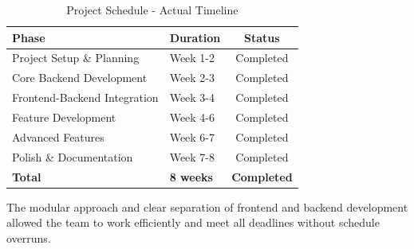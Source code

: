             \begin{table}[h]
            \centering
            \begin{tabular}{|l|l|c|}
            \hline
            \textbf{Phase} & \textbf{Duration} & \textbf{Status} \\
            \hline
            Project Setup \& Planning & Week 1-2 & Completed \\
            Core Backend Development & Week 2-3 & Completed \\
            Frontend-Backend Integration & Week 3-4 & Completed \\
            Feature Development & Week 4-6 & Completed \\
            Advanced Features & Week 6-7 & Completed \\
            Polish \& Documentation & Week 7-8 & Completed \\
            \hline
            \textbf{Total} & \textbf{8 weeks} & \textbf{Completed} \\
            \hline
            \end{tabular}
            \caption{Project Schedule - Actual Timeline}
            \end{table}

            The modular approach and clear separation of frontend and backend development allowed the team to work efficiently and meet all deadlines without schedule overruns.

